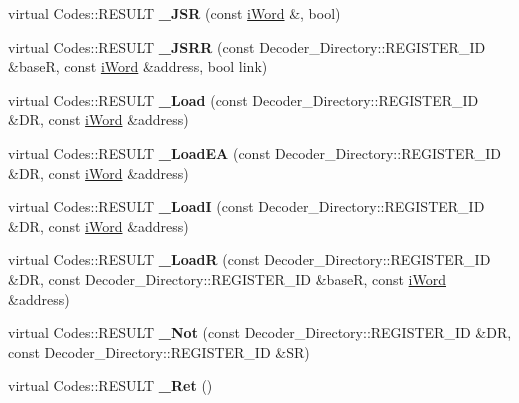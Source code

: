 \begin{DoxyCompactItemize}
\item 
\hypertarget{classWi11_a52b3325579e31ff96b4b441e682f7a9d}{
virtual Codes::RESULT {\bfseries \_\-JSR} (const \hyperlink{classiWord}{iWord} \&, bool)}
\label{classWi11_a52b3325579e31ff96b4b441e682f7a9d}

\item 
\hypertarget{classWi11_ac9b81d78bd364390dbe12bb29c3f0967}{
virtual Codes::RESULT {\bfseries \_\-JSRR} (const Decoder\_\-Directory::REGISTER\_\-ID \&baseR, const \hyperlink{classiWord}{iWord} \&address, bool link)}
\label{classWi11_ac9b81d78bd364390dbe12bb29c3f0967}

\item 
\hypertarget{classWi11_a0538e8d3ca35e6ca84646ae4b81ad5bd}{
virtual Codes::RESULT {\bfseries \_\-Load} (const Decoder\_\-Directory::REGISTER\_\-ID \&DR, const \hyperlink{classiWord}{iWord} \&address)}
\label{classWi11_a0538e8d3ca35e6ca84646ae4b81ad5bd}

\item 
\hypertarget{classWi11_a8b78bd154ed91178ea798bfd83bdc781}{
virtual Codes::RESULT {\bfseries \_\-LoadEA} (const Decoder\_\-Directory::REGISTER\_\-ID \&DR, const \hyperlink{classiWord}{iWord} \&address)}
\label{classWi11_a8b78bd154ed91178ea798bfd83bdc781}

\item 
\hypertarget{classWi11_a1eabd2329888b4ac7785fe67a066f814}{
virtual Codes::RESULT {\bfseries \_\-LoadI} (const Decoder\_\-Directory::REGISTER\_\-ID \&DR, const \hyperlink{classiWord}{iWord} \&address)}
\label{classWi11_a1eabd2329888b4ac7785fe67a066f814}

\item 
\hypertarget{classWi11_aff3d7b77430caa90933276c664c303fc}{
virtual Codes::RESULT {\bfseries \_\-LoadR} (const Decoder\_\-Directory::REGISTER\_\-ID \&DR, const Decoder\_\-Directory::REGISTER\_\-ID \&baseR, const \hyperlink{classiWord}{iWord} \&address)}
\label{classWi11_aff3d7b77430caa90933276c664c303fc}

\item 
\hypertarget{classWi11_ad343c78722e67d6bcfa8f5f52c525a97}{
virtual Codes::RESULT {\bfseries \_\-Not} (const Decoder\_\-Directory::REGISTER\_\-ID \&DR, const Decoder\_\-Directory::REGISTER\_\-ID \&SR)}
\label{classWi11_ad343c78722e67d6bcfa8f5f52c525a97}

\item 
\hypertarget{classWi11_a8cbd4e75c8c10f69f4159c02955b4a1f}{
virtual Codes::RESULT {\bfseries \_\-Ret} ()}
\label{classWi11_a8cbd4e75c8c10f69f4159c02955b4a1f}


\end{DoxyCompactItemize}

